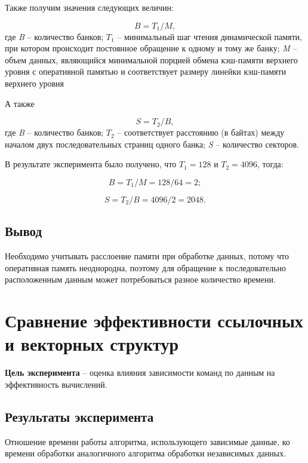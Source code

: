 

\clearpage


Также получим значения следующих величин:

\begin{equation}
	B = T_1 / M,
\end{equation}
где \textit{B} -- количество банков; $T_1$ -- минимальный шаг чтения динамической памяти, при котором происходит постоянное обращение к одному и тому же банку; \textit{M} -- объем данных, являющийся минимальной порцией обмена кэш-памяти верхнего уровня с оперативной памятью и соответствует размеру линейки кэш-памяти верхнего уровня


А также

\begin{equation}
	S = T_2 / B,
\end{equation}
где \textit{B} -- количество банков; $T_2$ -- соответствует расстоянию (в байтах) между началом двух последовательных страниц одного банка; \textit{S} -- количество секторов.


В результате эксперимента было получено, что $T_1 = 128$ и $T_2 = 4096$, тогда:

\begin{equation}
	B = T_1 / M = 128 / 64 = 2;
\end{equation}

\begin{equation}
	S = T_2 / B = 4096 / 2 = 2048.
\end{equation}


\subsection{Вывод}

Необходимо учитывать расслоение памяти при обработке данных, потому что оперативная память неоднородна, поэтому для обращение к последовательно расположенным данным может потребоваться разное количество времени.



\section{Сравнение эффективности ссылочных и векторных структур}

\textbf{Цель эксперимента} -- оценка   влияния   зависимости   команд   по   данным   на эффективность вычислений.

\subsection{Результаты эксперимента}
Отношение времени работы алгоритма, использующего зависимые данные, ко времени обработки аналогичного алгоритма обработки независимых данных.

